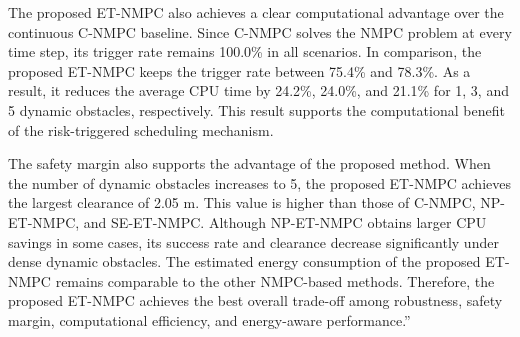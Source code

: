 \documentclass[12pt, twosides]{article}
\theoremstyle{definition}
\begin{document}
The proposed ET-NMPC also achieves a clear computational advantage over the continuous C-NMPC baseline. Since C-NMPC solves the NMPC problem at every time step, its trigger rate remains 100.0\% in all scenarios. In comparison, the proposed ET-NMPC keeps the trigger rate between 75.4\% and 78.3\%. As a result, it reduces the average CPU time by 24.2\%, 24.0\%, and 21.1\% for 1, 3, and 5 dynamic obstacles, respectively. This result supports the computational benefit of the risk-triggered scheduling mechanism.

The safety margin also supports the advantage of the proposed method. When the number of dynamic obstacles increases to 5, the proposed ET-NMPC achieves the largest clearance of 2.05 m. This value is higher than those of C-NMPC, NP-ET-NMPC, and SE-ET-NMPC. Although NP-ET-NMPC obtains larger CPU savings in some cases, its success rate and clearance decrease significantly under dense dynamic obstacles. The estimated energy consumption of the proposed ET-NMPC remains comparable to the other NMPC-based methods. Therefore, the proposed ET-NMPC achieves the best overall trade-off among robustness, safety margin, computational efficiency, and energy-aware performance.''
\end{document}
